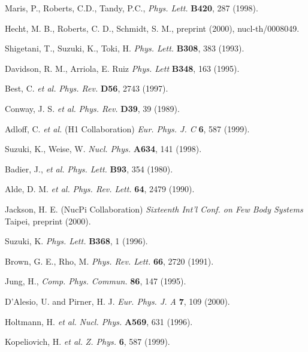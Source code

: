 \begin{references}

Maris, P., Roberts, C.D., Tandy, P.C., {\it Phys. Lett.}
        {\bf B420}, 287 (1998).

Hecht, M. B., Roberts, C. D., Schmidt, S. M., preprint
        (2000), nucl-th/0008049.

Shigetani, T., Suzuki, K., Toki, H. {\it Phys. Lett.}
         {\bf B308}, 383 (1993).

Davidson, R. M., Arriola, E. Ruiz
         {\it Phys. Lett} {\bf B348}, 163 (1995).

Best, C. {\it et al.} {\it Phys. Rev. } {\bf D56}, 2743
         (1997).

Conway, J. S. {\it et al.} {\it Phys. Rev. } {\bf D39},
         39 (1989).

Adloff, C. {\it et al.} (H1 Collaboration)
        {\it Eur.  Phys. J. C } {\bf 6}, 587 (1999).

Suzuki, K., Weise, W. {\it Nucl. Phys. } {\bf A634},
         141 (1998).

Badier, J., {\it et al.} {\it Phys. Lett. } {\bf B93},
         354 (1980).

 Alde, D. M. {\it et al.} {\it Phys. Rev. Lett.} 
        {\bf 64}, 2479 (1990).

 Jackson, H. E. (NucPi Collaboration) {\it Sixteenth 
        Int'l Conf. on Few Body Systems } Taipei, preprint (2000).

Suzuki, K. {\it Phys. Lett. } {\bf B368}, 1 (1996).

Brown, G. E., Rho, M. {\it Phys. Rev. Lett. } {\bf 66},
         2720 (1991).

 Jung, H., {\it Comp. Phys. Commun.} {\bf 86}, 147 (1995).

D'Alesio, U. and Pirner, H. J. {\it Eur. Phys. J. A }
         {\bf 7}, 109 (2000).

 Holtmann, H. {\it et al.} {\it Nucl. Phys.}
         {\bf A569}, 631 (1996).

 Kopeliovich, H. {\it et al.} {\it Z. Phys.  }
         {\bf 6}, 587 (1999).




\end{references}

